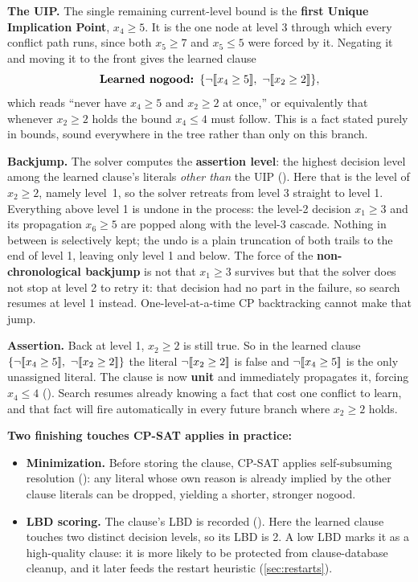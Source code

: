\textbf{The UIP.} The single remaining current-level bound is the
\textbf{first Unique Implication Point}, $x_4 \ge 5$. It is the one node at level
3 through which every conflict path runs, since both $x_5 \ge 7$ and $x_5 \le 5$
were forced by it. Negating it and moving it to the front gives the learned
clause
\[
  \textbf{Learned nogood: }
  \{\lnot[\![x_4 \ge 5]\!],\ \lnot[\![x_2 \ge 2]\!]\},
\]
which reads ``never have $x_4 \ge 5$ and $x_2 \ge 2$ at once,'' or equivalently
that whenever $x_2 \ge 2$ holds the bound $x_4 \le 4$ must follow. This is a fact
stated purely in bounds, sound everywhere in the tree rather than only on this
branch.

\textbf{Backjump.} The solver computes the \textbf{assertion level}: the highest
decision level among the learned clause's literals \emph{other than} the UIP
(). Here that is the
level of $x_2 \ge 2$, namely level~1, so the solver retreats from level 3 straight
to level 1. Everything above level 1 is undone in the process: the level-2
decision $x_1 \ge 3$ and its propagation $x_6 \ge 5$ are popped along with the
level-3 cascade. Nothing in between is selectively kept; the undo is a plain
truncation of both trails to the end of level 1, leaving only level 1 and below.
The force of the \textbf{non-chronological backjump} is not that $x_1 \ge 3$
survives but that the solver does not stop at level 2 to retry it: that decision
had no part in the failure, so search resumes at level 1 instead.
One-level-at-a-time CP backtracking cannot make that jump.

\textbf{Assertion.} Back at level 1, $x_2 \ge 2$ is still true. So in the learned
clause $\{\lnot[\![x_4 \ge 5]\!],\ \lnot[\![x_2 \ge 2]\!]\}$ the literal $\lnot[\![x_2 \ge 2]\!]$ is false and
$\lnot[\![x_4 \ge 5]\!]$ is the only unassigned literal. The clause
is now \textbf{unit} and immediately propagates it, forcing $x_4 \le 4$
().
Search resumes already knowing a fact that cost one conflict to learn, and that
fact will fire automatically in every future branch where $x_2 \ge 2$ holds.

\textbf{Two finishing touches CP-SAT applies in practice:}

\begin{itemize}
  \item \textbf{Minimization.} Before storing the clause, CP-SAT applies
  self-subsuming resolution (): any literal whose own reason is already implied
  by the other clause literals can be dropped, yielding a shorter, stronger
  nogood.
  \item \textbf{LBD scoring.} The clause's LBD is recorded
  (). Here the learned clause
  touches two distinct decision levels, so its LBD is 2. A low LBD marks it as a
  high-quality clause: it is more likely to be protected from clause-database
  cleanup, and it later feeds the restart heuristic (\cref{sec:restarts}).
\end{itemize}

